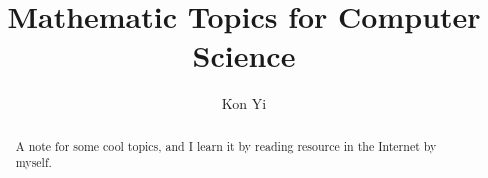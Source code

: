 \documentclass[a4paper]{report}
\author{Kon Yi}
\title{Mathematic Topics for Computer Science}
\begin{document}
\maketitle

\begin{abstract}
	A note for some cool topics, and I learn it by reading resource in the Internet by myself.
\end{abstract}

\newpage

\tableofcontents


\newpage
\appendix
\appendixpage{}



\newpage
\pagestyle{plain}
\printbibliography{}
\end{document}
